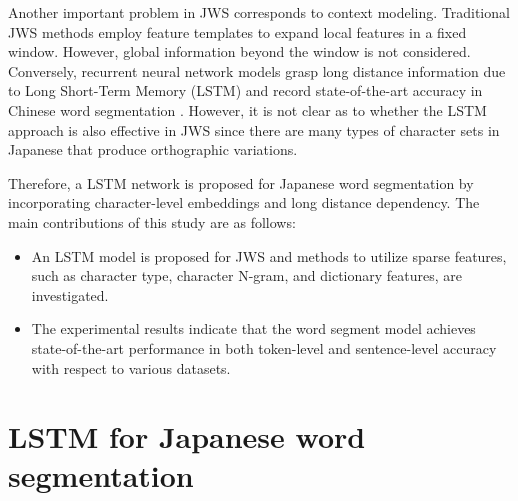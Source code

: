 \documentclass[11pt,letterpaper]{article}
\begin{document}
Another important problem in JWS corresponds to context modeling. Traditional JWS methods employ feature templates to expand local features in a fixed window. However, global information beyond the window is not considered. Conversely, recurrent neural network models grasp long distance information due to Long Short-Term Memory (LSTM) and record state-of-the-art accuracy in Chinese word segmentation \cite{chen-EtAl:2015:EMNLP2}. 
However, it is not clear as to whether the LSTM approach is also effective in JWS since there are many types of character sets in Japanese that produce orthographic variations. 

Therefore, a LSTM network is proposed for Japanese word segmentation by incorporating character-level embeddings and long distance dependency.
The main contributions of this study are as follows:

\begin{itemize}

\item An LSTM model is proposed for JWS and methods to utilize sparse features, such as character type, character N-gram, and dictionary features, are investigated. %

\item The experimental results indicate that the word segment model achieves state-of-the-art performance in both token-level and sentence-level accuracy with respect to various datasets. 




\end{itemize}

\section{LSTM for Japanese word segmentation}
\end{document}
